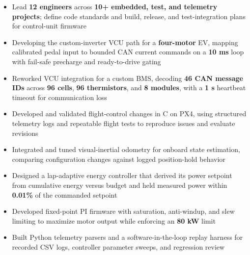 \documentclass[10pt,letterpaper]{article}
\renewcommand{\entryspace}{\vspace{0pt}}
\begin{document}
\bodyfont

\resumeheader
\educationsection




\orgline{\spartanracing}
\begin{itemize}
  \item Lead \textbf{12 engineers} across \textbf{10+ embedded, test, and telemetry projects}; define code standards and build, release, and test-integration plans for control-unit firmware
  \item Developing the custom-inverter VCU path for a \textbf{four-motor} EV, mapping calibrated pedal input to bounded CAN current commands on a \textbf{10 ms} loop with fail-safe precharge and ready-to-drive gating
  \item Reworked VCU integration for a custom BMS, decoding \textbf{46 CAN message IDs} across \textbf{96 cells}, \textbf{96 thermistors}, and \textbf{8 modules}, with a \textbf{1 s} heartbeat timeout for communication loss
\end{itemize}

\entryspace

\begin{itemize}
  \item Developed and validated flight-control changes in C on PX4, using structured telemetry logs and repeatable flight tests to reproduce issues and evaluate revisions
  \item Integrated and tuned visual-inertial odometry for onboard state estimation, comparing configuration changes against logged position-hold behavior
\end{itemize}

\entryspace

\orgline{\spartanracing}
\begin{itemize}
  \item Designed a lap-adaptive energy controller that derived its power setpoint from cumulative energy versus budget and held measured power within \textbf{0.01\%} of the commanded setpoint
  \item Developed fixed-point PI firmware with saturation, anti-windup, and slew limiting to maximize motor output while enforcing an \textbf{80 kW} limit
  \item Built Python telemetry parsers and a software-in-the-loop replay harness for recorded CSV logs, controller parameter sweeps, and regression review
\end{itemize}
\end{document}
